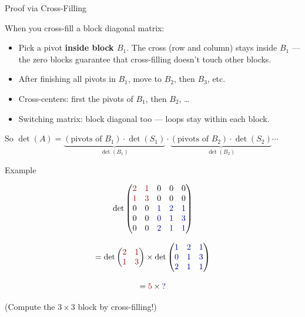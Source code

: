 \documentclass[10pt]{beamer}
\theoremstyle{definition}
\newcommand{\x}[1]{\alert{\textbf{#1}}}
\newcommand{\rd}[1]{{\color{red!70!black}#1}}
\newcommand{\bl}[1]{{\color{blue!70!black}#1}}
\begin{document}
\begin{frame}{Proof via Cross-Filling}

When you cross-fill a block diagonal matrix:

\vfill

\begin{itemize}
\item Pick a pivot \x{inside block $B_1$}. The cross (row and column) stays inside $B_1$ --- the zero blocks guarantee that cross-filling doesn't touch other blocks.

\vfill

\item After finishing all pivots in $B_1$, move to $B_2$, then $B_3$, etc.

\vfill

\item Cross-centers: first the pivots of $B_1$, then $B_2$, \ldots

\vfill

\item Switching matrix: block diagonal too --- loops stay within each block.
\end{itemize}

\vfill

So $\det(A) = \underbrace{(\text{pivots of } B_1) \cdot \det(S_1)}_{\det(B_1)} \cdot \underbrace{(\text{pivots of } B_2) \cdot \det(S_2)}_{\det(B_2)} \cdots$

\end{frame}


\begin{frame}{Example}

$$
\det\begin{pmatrix}
\rd{2} & \rd{1} & 0 & 0 & 0 \\
\rd{1} & \rd{3} & 0 & 0 & 0 \\
0 & 0 & \bl{1} & \bl{2} & \bl{1} \\
0 & 0 & \bl{0} & \bl{1} & \bl{3} \\
0 & 0 & \bl{2} & \bl{1} & \bl{1}
\end{pmatrix}
$$

\vfill

$$
= \det\begin{pmatrix} \rd{2} & \rd{1} \\ \rd{1} & \rd{3} \end{pmatrix}
\times
\det\begin{pmatrix} \bl{1} & \bl{2} & \bl{1} \\ \bl{0} & \bl{1} & \bl{3} \\ \bl{2} & \bl{1} & \bl{1} \end{pmatrix}
$$

\vfill

$$= \rd{5} \times \bl{?}$$

\vfill

{\footnotesize (Compute the $3\times 3$ block by cross-filling!)}

\end{frame}
\end{document}
